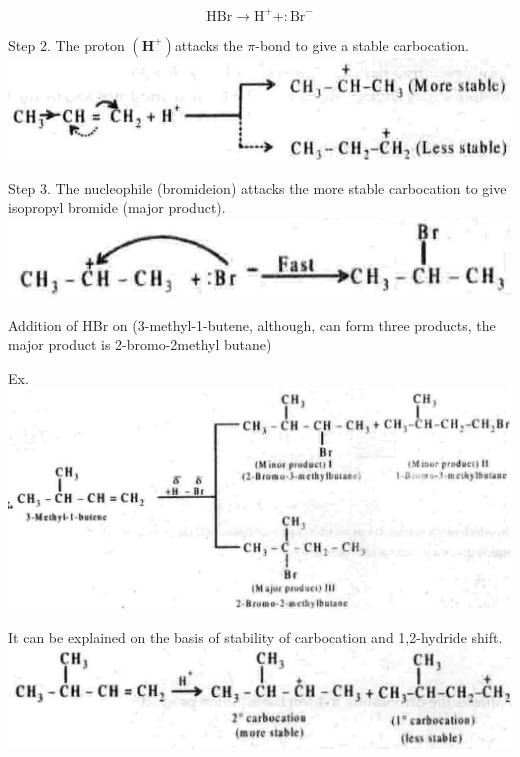 \documentclass[10pt]{article}
\begin{document}
$$
\mathrm{HBr} \longrightarrow \mathrm{H}^{+}+: \mathrm{Br}^{-}
$$

Step 2. The proton $\left(\mathbf{H}^{+}\right)$attacks the $\pi$-bond to give a stable carbocation.\\
\includegraphics[max width=\textwidth, center]{2025_01_28_8470952b98110cec3aabg-096(3)}

Step 3. The nucleophile (bromideion) attacks the more stable carbocation to give isopropyl bromide (major product).\\
\includegraphics[max width=\textwidth, center]{2025_01_28_8470952b98110cec3aabg-096}

Addition of HBr on (3-methyl-1-butene, although, can form three products, the major product is 2-bromo-2methyl butane)

Ex.\\
\includegraphics[max width=\textwidth, center]{2025_01_28_8470952b98110cec3aabg-096(5)}

It can be explained on the basis of stability of carbocation and 1,2-hydride shift.\\
\includegraphics[max width=\textwidth, center]{2025_01_28_8470952b98110cec3aabg-096(1)}
\end{document}
